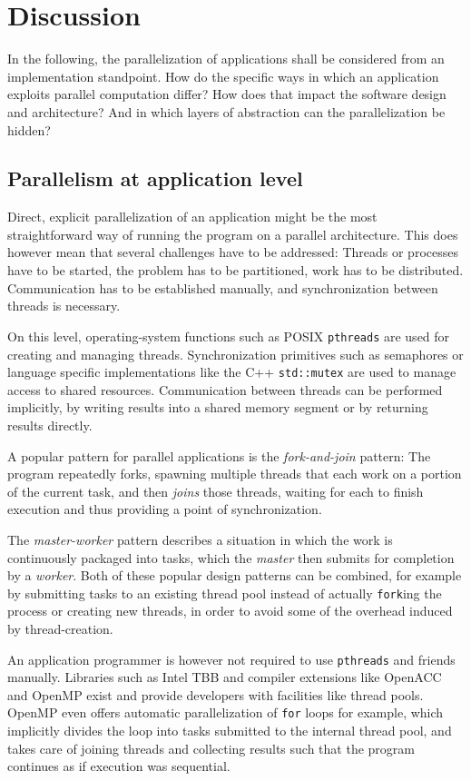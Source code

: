 \documentclass[BCOR20mm,DIV14,10pt,headinclude,footexclude,bibtotoc,liststotoc]{article}
\begin{document}
\section{Discussion}
In the following, the parallelization of applications shall be considered from
an implementation standpoint. How do the specific ways in which an application
exploits parallel computation differ? How does that impact the software design
and architecture? And in which layers of abstraction can the parallelization be
hidden?

\subsection{Parallelism at application level}
Direct, explicit parallelization of an application might be the most
straightforward way of running the program on a parallel architecture. This does
however mean that several challenges have to be addressed: Threads or processes
have to be started, the problem has to be partitioned, work has to be
distributed. Communication has to be established manually, and synchronization
between threads is necessary.

On this level, operating-system functions such as POSIX \texttt{pthreads} are
used for creating and managing threads. Synchronization primitives such as
semaphores or language specific implementations like the C++ \texttt{std::mutex}
are used to manage access to shared resources. Communication between threads can
be performed implicitly, by writing results into a shared memory segment or by
returning results directly.

A popular pattern for parallel applications is the \emph{fork-and-join} pattern:
The program repeatedly forks, spawning multiple threads that each work on a
portion of the current task, and then \emph{joins} those threads, waiting for
each to finish execution and thus providing a point of synchronization.

The \emph{master-worker} pattern describes a situation in which the work is
continuously packaged into tasks, which the \emph{master} then submits for
completion by a \emph{worker}. Both of these popular design patterns can be
combined, for example by submitting tasks to an existing thread pool instead of
actually \texttt{fork}ing the process or creating new threads, in order to avoid
some of the overhead induced by thread-creation.

An application programmer is however not required to use \texttt{pthreads} and
friends manually. Libraries such as Intel TBB and compiler extensions like
OpenACC \cite{openacc} and OpenMP \cite{openmp} exist and provide developers
with facilities like thread pools. OpenMP even offers automatic parallelization
of \texttt{for} loops for example, which implicitly divides the loop into tasks
submitted to the internal thread pool, and takes care of joining threads and
collecting results such that the program continues as if execution was
sequential.
\end{document}
